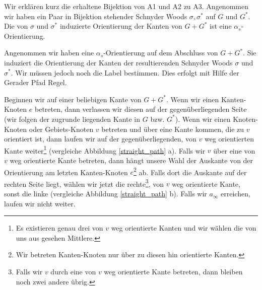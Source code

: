 Wir erklären kurz die erhaltene Bijektion von A1 und A2 zu A3. Angenommen wir haben ein Paar in Bijektion stehender Schnyder Woods $\sigma,\sigma^*$ auf $G$ und $G^*$. Die von $\sigma$ und $\sigma^*$ induzierte Orientierung der Kanten von $G+G^*$ ist eine $\alpha_s$-Orientierung. 

Angenommen wir haben eine $\alpha_s$-Orientierung auf dem Abschluss von $G+G^*$. Sie induziert die Orientierung der Kanten der resultierenden Schnyder Woods $\sigma$ und $\sigma^*$. Wir müssen jedoch noch die Label bestimmen. Dies erfolgt mit Hilfe der Gerader Pfad Regel. 

\begin{description}[leftmargin =0pt, font = \rmfamily ]
\item[Gerader Pfad Regel:] Beginnen wir auf einer beliebigen Kante von $G+G^*$. Wenn wir einen Kanten-Knoten $e$ betreten, dann verlassen wir diesen auf der gegenüberliegenden Seite (wir folgen der zugrunde liegenden Kante in $G$ bzw. $G^*$). Wenn wir einen Knoten-Knoten oder Gebiets-Knoten $v$ betreten und über eine Kante kommen, die zu $v$ orientiert ist, dann laufen wir auf der gegenüberliegenden, von $v$ weg orientierten Kante weiter\footnote{Es existieren genau drei von $v$ weg orientierte Kanten und wir wählen die von uns aus gesehen Mittlere.} (vergleiche Abbildung \ref{straight_path} a). Falls wir $v$ über eine von $v$ weg orientierte Kante betreten, dann hängt unsere Wahl der Auskante von der Orientierung am letzten Kanten-Knoten $e$\footnote{Wir betreten Kanten-Knoten nur über zu diesen hin orientierte Kanten.} ab. Falls dort die Auskante auf der rechten Seite liegt, wählen wir jetzt die rechte\footnote{Falls wir $v$ durch eine von $v$ weg orientierte Kante betreten, dann bleiben noch zwei andere übrig.}, von $v$ weg orientierte Kante, sonst die linke (vergleiche Abbildung \ref{straight_path} b). Falls wir $a_\infty$ erreichen, laufen wir nicht weiter. 
\end{description}

